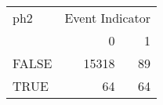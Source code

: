 \begin{tabular}{lrr}
   \hline
  ph2&  \multicolumn{2}{c}{Event Indicator}   \\  
&0& 1\\ 
\hline
FALSE & 15318 & 89 \\ 
  TRUE & 64 & 64 \\ 
   \hline
\end{tabular}
